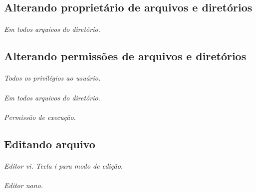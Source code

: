 \documentclass[a4paper,9pt]{extarticle}
\begin{document}
\begin{multicols}{2}
\subsection{Alterando proprietário de arquivos e diretórios}

	\paragraph{}
	
	\paragraph{} \emph{Em todos arquivos do diretório.}
	
\subsection{Alterando permissões de arquivos e diretórios}

	\paragraph{} \emph{Todos os privilégios ao usuário.}
	\paragraph{} \emph{Em todos arquivos do diretório.}
	\paragraph{} \emph{Permissão de execução.}

\subsection{Editando arquivo}
	
	\paragraph{} \emph{Editor vi. Tecla i para modo de edição.}
	\paragraph{} \emph{Editor nano.}


\end{multicols}
\end{document}
